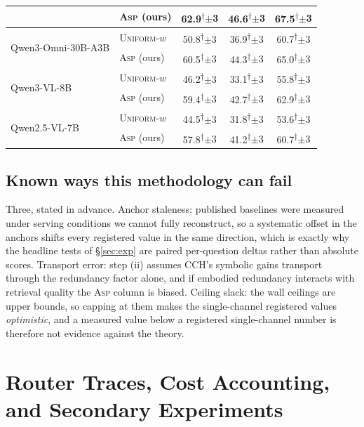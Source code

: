\documentclass[10pt]{article}
\theoremstyle{definition}
\theoremstyle{plain}
\newcommand{\pred}{\textsuperscript{\textcolor{cpred}{$\dagger$}}}
\newcommand{\ASP}{\textsc{Asp}}
\begin{document}
\begin{table}[!t]
\begin{tabular}{llccc}
 & \ASP{} (ours) & 62.9\pred{\scriptsize$\pm$3} & 46.6\pred{\scriptsize$\pm$3} & 67.5\pred{\scriptsize$\pm$3} \\
\midrule
\multirow{2}{*}{Qwen3-Omni-30B-A3B}
 & \textsc{Uniform-}$w$ & 50.8\pred{\scriptsize$\pm$3} & 36.9\pred{\scriptsize$\pm$3} & 60.7\pred{\scriptsize$\pm$3} \\
 & \ASP{} (ours) & 60.5\pred{\scriptsize$\pm$3} & 44.3\pred{\scriptsize$\pm$3} & 65.0\pred{\scriptsize$\pm$3} \\
\midrule
\multirow{2}{*}{Qwen3-VL-8B}
 & \textsc{Uniform-}$w$ & 46.2\pred{\scriptsize$\pm$3} & 33.1\pred{\scriptsize$\pm$3} & 55.8\pred{\scriptsize$\pm$3} \\
 & \ASP{} (ours) & 59.4\pred{\scriptsize$\pm$3} & 42.7\pred{\scriptsize$\pm$3} & 62.9\pred{\scriptsize$\pm$3} \\
\midrule
\multirow{2}{*}{Qwen2.5-VL-7B}
 & \textsc{Uniform-}$w$ & 44.5\pred{\scriptsize$\pm$3} & 31.8\pred{\scriptsize$\pm$3} & 53.6\pred{\scriptsize$\pm$3} \\
 & \ASP{} (ours) & 57.8\pred{\scriptsize$\pm$3} & 41.2\pred{\scriptsize$\pm$3} & 60.7\pred{\scriptsize$\pm$3} \\
\bottomrule
\end{tabular}
\end{table}

\subsection{Known ways this methodology can fail}
Three, stated in advance. Anchor staleness: published baselines were measured under serving conditions we cannot fully reconstruct, so a systematic offset in the anchors shifts every registered value in the same direction, which is exactly why the headline tests of \S\ref{sec:exp} are paired per-question deltas rather than absolute scores. Transport error: step (ii) assumes CCH's symbolic gains transport through the redundancy factor alone, and if embodied redundancy interacts with retrieval quality the \ASP{} column is biased. Ceiling slack: the wall ceilings are upper bounds, so capping at them makes the single-channel registered values \emph{optimistic}, and a measured value below a registered single-channel number is therefore not evidence against the theory.

\section{Router Traces, Cost Accounting, and Secondary Experiments}
\label{app:traces}\label{app:edge}\label{app:qual}
\end{document}
